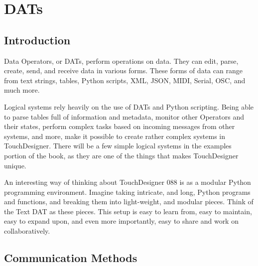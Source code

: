 \cleardoublepage
\chapter{DATs}
\label{ch:5}


\section{Introduction}

\begin{fullwidth}

Data Operators, or DATs, perform operations on data. They can edit, parse, create, send, and receive data in various forms. These forms of data can range from text strings, tables, Python scripts, XML, JSON, MIDI, Serial, OSC, and much more.

Logical systems rely heavily on the use of DATs and Python scripting. Being able to parse tables full of information and metadata, monitor other Operators and their states, perform complex tasks based on incoming messages from other systems, and more, make it possible to create rather complex systems in TouchDesigner. There will be a few simple logical systems in the examples portion of the book, as they are one of the things that makes TouchDesigner unique.

An interesting way of thinking about TouchDesigner 088 is as a modular Python programming environment. Imagine taking intricate, and long, Python programs and functions, and breaking them into light-weight, and modular pieces. Think of the Text DAT as these pieces. This setup is easy to learn from, easy to maintain, easy to expand upon, and even more importantly, easy to share and work on collaboratively.

\end{fullwidth}


\section{Communication Methods}

